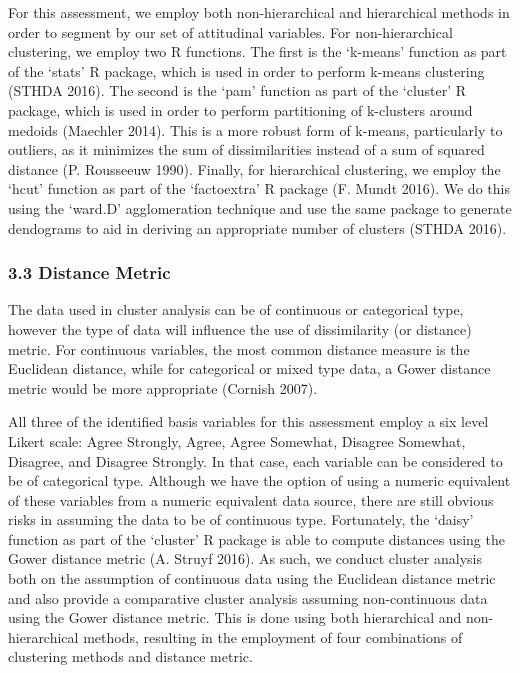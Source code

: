 \documentclass[]{article}
\begin{document}
For this assessment, we employ both non-hierarchical and hierarchical
methods in order to segment by our set of attitudinal variables. For
non-hierarchical clustering, we employ two R functions. The first is the
`k-means' function as part of the `stats' R package, which is used in
order to perform k-means clustering (STHDA 2016). The second is the
`pam' function as part of the `cluster' R package, which is used in
order to perform partitioning of k-clusters around medoids (Maechler
2014). This is a more robust form of k-means, particularly to outliers,
as it minimizes the sum of dissimilarities instead of a sum of squared
distance (P. Rousseeuw 1990). Finally, for hierarchical clustering, we
employ the `hcut' function as part of the `factoextra' R package (F.
Mundt 2016). We do this using the `ward.D' agglomeration technique and
use the same package to generate dendograms to aid in deriving an
appropriate number of clusters (STHDA 2016).

\subsubsection{3.3 Distance Metric}\label{distance-metric}

The data used in cluster analysis can be of continuous or categorical
type, however the type of data will influence the use of dissimilarity
(or distance) metric. For continuous variables, the most common distance
measure is the Euclidean distance, while for categorical or mixed type
data, a Gower distance metric would be more appropriate (Cornish 2007).

All three of the identified basis variables for this assessment employ a
six level Likert scale: Agree Strongly, Agree, Agree Somewhat, Disagree
Somewhat, Disagree, and Disagree Strongly. In that case, each variable
can be considered to be of categorical type. Although we have the option
of using a numeric equivalent of these variables from a numeric
equivalent data source, there are still obvious risks in assuming the
data to be of continuous type. Fortunately, the `daisy' function as part
of the `cluster' R package is able to compute distances using the Gower
distance metric (A. Struyf 2016). As such, we conduct cluster analysis
both on the assumption of continuous data using the Euclidean distance
metric and also provide a comparative cluster analysis assuming
non-continuous data using the Gower distance metric. This is done using
both hierarchical and non-hierarchical methods, resulting in the
employment of four combinations of clustering methods and distance
metric.
\end{document}
